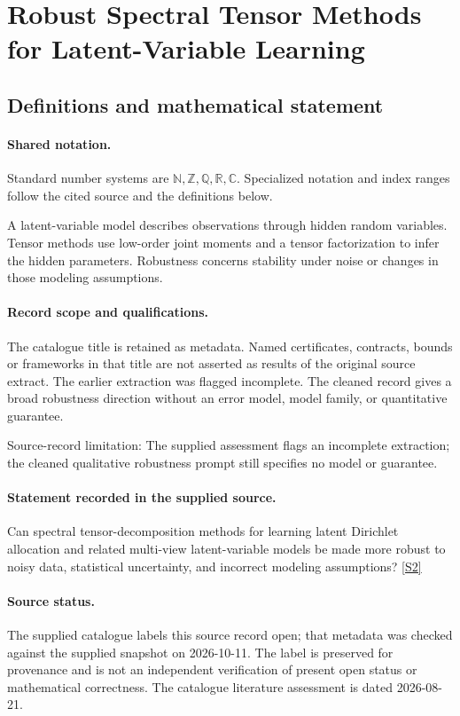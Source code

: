 \documentclass[11pt]{article}
\newcommand{\sref}[2]{\hyperlink{source:#1:#2}{[S#2]}}
\begin{document}
\section{Robust Spectral Tensor Methods for Latent-Variable Learning}\label{statement}

\subsection{Definitions and mathematical statement}

\paragraph{Shared notation.}Standard number systems are $\mathbb N,\mathbb Z,\mathbb Q,\mathbb R,\mathbb C$. Specialized notation and index ranges follow the cited source and the definitions below.


A latent-variable model describes observations through hidden random variables. Tensor methods use low-order joint moments and a tensor factorization to infer the hidden parameters. Robustness concerns stability under noise or changes in those modeling assumptions.
\paragraph{Record scope and qualifications.}
The catalogue title is retained as metadata. Named certificates, contracts, bounds or frameworks in that title are not asserted as results of the original source extract.
The earlier extraction was flagged incomplete. The cleaned record gives a broad robustness direction without an error model, model family, or quantitative guarantee.

Source-record limitation: The supplied assessment flags an incomplete extraction; the cleaned qualitative robustness prompt still specifies no model or guarantee.
\paragraph{Statement recorded in the supplied source.}
Can spectral tensor-decomposition methods for learning latent Dirichlet allocation and related multi-view latent-variable models be made more robust to noisy data, statistical uncertainty, and incorrect modeling assumptions? \sref{statement}{2}
\paragraph{Source status.}
The supplied catalogue labels this source record open; that metadata was checked against the supplied snapshot on 2026-10-11. The label is preserved for provenance and is not an independent verification of present open status or mathematical correctness. The catalogue literature assessment is dated 2026-08-21.
\end{document}
